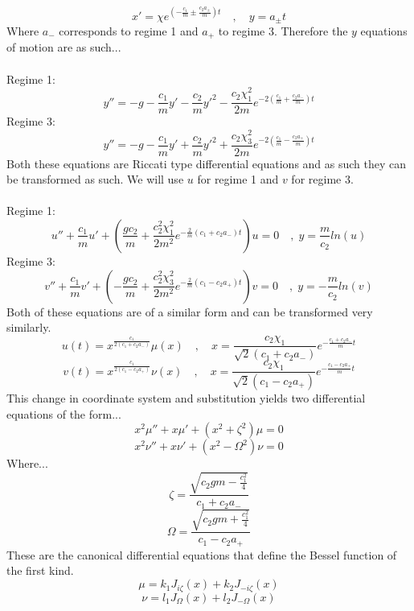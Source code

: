 \documentclass{article}
\begin{document}
$$
x' = \chi e^{(-\frac{c_{1}}{m} \pm \frac{c_{2}a_{\pm}}{m})t} \quad , \quad y=a_{\pm}t
$$
Where $a_{-}$ corresponds to regime 1 and $a_{+}$ to regime 3. Therefore the $y$ equations of motion are as such...
\\
\\
Regime 1:
$$
y''=-g-\frac{c_{1}}{m}y'-\frac{c_{2}}{m}y'^{2}-\frac{c_{2}\chi^{2}_{1}}{2m}e^{-2(\frac{c_{1}}{m} + \frac{c_{2}a_{-}}{m})t}
$$
Regime 3:
$$
y''=-g-\frac{c_{1}}{m}y'+\frac{c_{2}}{m}y'^{2}+\frac{c_{2}\chi^{2}_{3}}{2m}e^{-2(\frac{c_{1}}{m} - \frac{c_{2}a_{+}}{m})t}
$$
Both these equations are Riccati type differential equations and as such they can be transformed as such. We will use $u$ for regime 1 and $v$ for regime 3.
\\
\\
Regime 1:
$$
u''+\frac{c_{1}}{m}u'+(\frac{gc_{2}}{m}+\frac{c_{2}^{2}\chi^{2}_{1}}{2m^{2}}e^{-\frac{2}{m}(c_{1}+c_{2}a_{-})t})u=0 \quad , \; y= \frac{m}{c_{2}}ln(u)
$$
Regime 3:
$$
v''+\frac{c_{1}}{m}v' + (-\frac{gc_{2}}{m}+\frac{c_{2}^{2}\chi^{2}_{3}}{2m^{2}}e^{-\frac{2}{m}(c_{1}-c_{2}a_{+})t})v=0 \quad , \; y= -\frac{m}{c_{2}}ln(v)
$$
Both of these equations are of a similar form and can be transformed very similarly.
$$
u(t) = x^{\frac{c_{1}}{2(c_{1}+c_{2}a_{-})}}\mu(x) \quad , \quad x = \frac{c_{2}\chi_{1}}{\sqrt{2}(c_{1}+c_{2}a_{-})}e^{-\frac{c_{1}+c_{2}a_{-}}{m}t}
$$
$$
v(t) = x^{\frac{c_{1}}{2(c_{1}-c_{2}a_{+})}}\nu(x) \quad , \quad x = \frac{c_{2}\chi_{1}}{\sqrt{2}(c_{1}-c_{2}a_{+})}e^{-\frac{c_{1}-c_{2}a_{+}}{m}t}
$$
This change in coordinate system and substitution yields two differential equations of the form...
$$
x^{2}\mu''+x\mu'+(x^2+\zeta^{2})\mu=0
$$
$$
x^{2}\nu''+x\nu'+(x^2-\Omega^{2})\nu=0
$$
Where...
$$
\zeta  = \frac{\sqrt{c_{2}gm-\frac{c_{1}^{2}}{4}}}{c_{1}+c_{2}a_{-}}
$$
$$
\Omega =  \frac{\sqrt{c_{2}gm+\frac{c_{1}^{2}}{4}}}{c_{1}-c_{2}a_{+}}
$$
These are the canonical differential equations that define the Bessel function of the first kind.
$$
\mu = k_{1}J_{i\zeta}(x)+k_{2}J_{-i\zeta}(x)
$$
$$
\nu = l_{1}J_{\Omega}(x)+l_{2}J_{-\Omega}(x)
$$
\end{document}
